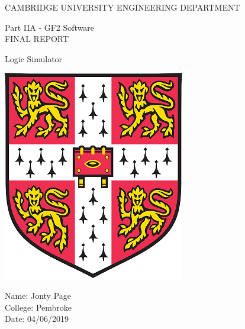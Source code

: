 \documentclass{article}					%
\begin{document}


\begin{titlepage} 						%
\centering								%

\vspace*{\fill}							%

\huge{CAMBRIDGE UNIVERSITY ENGINEERING DEPARTMENT}\\		%
\vspace{1 cm}

\LARGE{Part IIA - GF2 Software}\\
\LARGE{FINAL REPORT}
\vspace{1.5 cm}

\begin{mdframed}						%
\centering
\LARGE{Logic Simulator}
\end{mdframed}

\vspace{0.25 cm}

\begin{center}
\includegraphics{cambridge}
\end{center}

\vspace{0.5 cm}

\begin{flushleft}
\large{Name: Jonty Page\\				%
College: Pembroke\\
Date: 04/06/2019\\}


\end{flushleft}
\end{titlepage}
\end{document}
